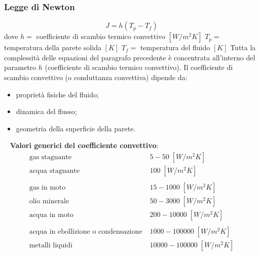 \subsubsection{Legge di Newton}
\[
    J = h (T_p - T_f)
\]
dove \newline
$h =$ coefficiente di scambio termico convettivo $[W/m^2 K]$\newline
$T_p =$ temperatura della parete solida $[K]$\newline
$T_f =$ temperatura del fluido $[K]$\newline
\newline
Tutta la complessità delle equazioni del paragrafo precedente è concentrata all'interno del parametro $h$ (coefficiente di scambio termico convettivo).\newline
Il coefficiente di scambio convettivo (o conduttanza convettiva) dipende da:
\begin{itemize}
    \item proprietà fisiche del fluido;
    \item dinamica del flusso;
    \item geometria della superficie della parete.
\end{itemize}
\ \newline
\textbf{Valori generici del coefficiente convettivo}:\newline
\[
    \begin{matrix}
        \text{gas stagnante}\; & 5-50 \; [W/m^2K]\\
        \text{acqua stagnante}\;& 100 \; [W/m^2K]\\
        \\
        \text{gas in moto}\; & 15-1000 \; [W/m^2K]\\
        \text{olio minerale}\; & 50-3000\; [W/m^2K]\\
        \text{acqua in moto}\; &200-10000\; [W/m^2K]\\
        \\
        \text{acqua in ebollizione o condensazione}\; &1000-100000\; [W/m^2K]\\
        \text{metalli liquidi}\; &10000-100000\; [W/m^2K]\\
    \end{matrix}
\]
